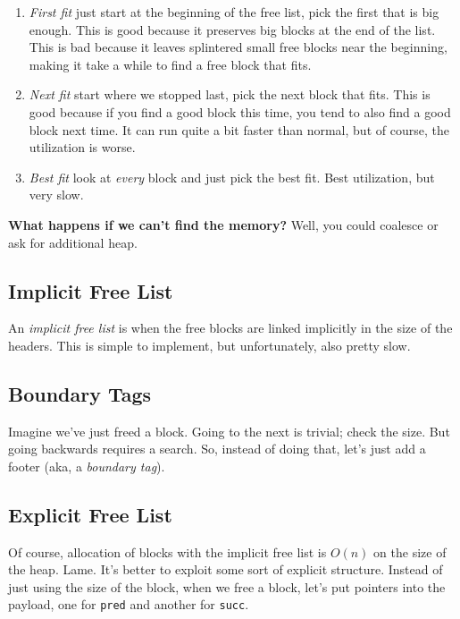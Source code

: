 \documentclass[fleqn]{article}
\begin{document}
\begin{enumerate}
\item \textit{First fit} just start at the beginning of the free list, pick the first that is big enough. This is good because it preserves big blocks at the end of the list. This is bad because it leaves splintered small free blocks near the beginning, making it take a while to find a free block that fits.

\item \textit{Next fit} start where we stopped last, pick the next block that fits. This is good because if you find a good block this time, you tend to also find a good block next time. It can run quite a bit faster than normal, but of course, the utilization is worse.

\item \textit{Best fit} look at \textit{every} block and just pick the best fit. Best utilization, but very slow.
\end{enumerate}

\textbf{What happens if we can't find the memory?} Well, you could coalesce or ask for additional heap.

\subsection{Implicit Free List}

An \textit{implicit free list} is when the free blocks are linked implicitly in the size of the headers. This is simple to implement, but unfortunately, also pretty slow.

\subsection{Boundary Tags}

Imagine we've just freed a block. Going to the next is trivial; check the size. But going backwards requires a search. So, instead of doing that, let's just add a footer (aka, a \textit{boundary tag}).

\subsection{Explicit Free List}

Of course, allocation of blocks with the implicit free list is $O(n)$ on the size of the heap. Lame. It's better to exploit some sort of explicit structure. Instead of just using the size of the block, when we free a block, let's put pointers into the payload, one for \texttt{pred} and another for \texttt{succ}.
\end{document}
